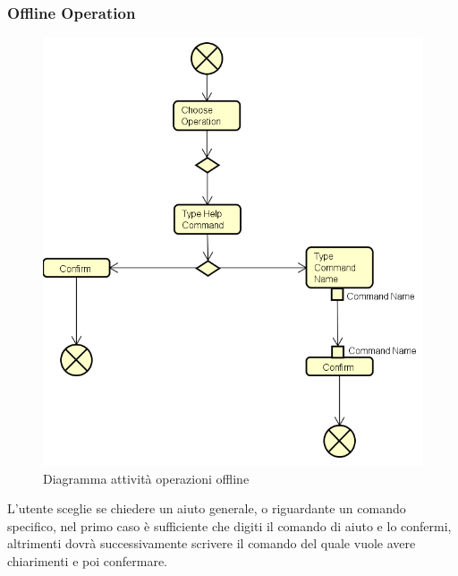 \documentclass[a4paper]{article}
\begin{document}
		\subsubsection{Offline Operation}
			\begin{figure} [H]
				\centering
				\includegraphics[scale=0.6]{ST/client/diagramma-offline-operation.png}
				\caption{Diagramma attività operazioni offline}
			\end{figure}
				L'utente sceglie se chiedere un aiuto generale, o riguardante un comando specifico, nel primo caso è sufficiente che digiti il comando di aiuto e lo confermi, altrimenti dovrà successivamente scrivere il comando del quale vuole avere chiarimenti e poi confermare.
\end{document}
